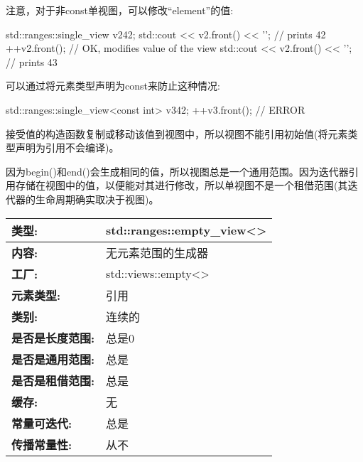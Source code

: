 注意，对于非const单视图，可以修改“element”的值:

\begin{cpp}
std::ranges::single_view v2{42};
std::cout << v2.front() << '\n'; // prints 42
++v2.front(); // OK, modifies value of the view
std::cout << v2.front() << '\n'; // prints 43
\end{cpp}

可以通过将元素类型声明为const来防止这种情况:

\begin{cpp}
std::ranges::single_view<const int> v3{42};
++v3.front(); // ERROR
\end{cpp}

接受值的构造函数复制或移动该值到视图中，所以视图不能引用初始值(将元素类型声明为引用不会编译)。

因为begin()和end()会生成相同的值，所以视图总是一个通用范围。因为迭代器引用存储在视图中的值，以便能对其进行修改，所以单视图不是一个租借范围(其迭代器的生命周期确实取决于视图)。


\begin{longtable}[c]{|l|l|}
\hline
\textbf{类型:}                 & std::ranges::empty\_view\textless{}\textgreater{} \\ \hline
\endfirsthead
%
\endhead
%
\textbf{内容:}              & 无元素范围的生成器               \\ \hline
\textbf{工厂:}              & std::views::empty\textless{}\textgreater{}        \\ \hline
\textbf{元素类型:}         & 引用                                         \\ \hline
\textbf{类别:}             & 连续的                                        \\ \hline
\textbf{是否是长度范围:}       & 总是0                                \\ \hline
\textbf{是否是通用范围:}      & 总是                                            \\ \hline
\textbf{是否是租借范围:}    & 总是                                            \\ \hline
\textbf{缓存:}               & 无                                           \\ \hline
\textbf{常量可迭代:}       & 总是                                            \\ \hline
\textbf{传播常量性:} & 从不                                             \\ \hline
\end{longtable}

